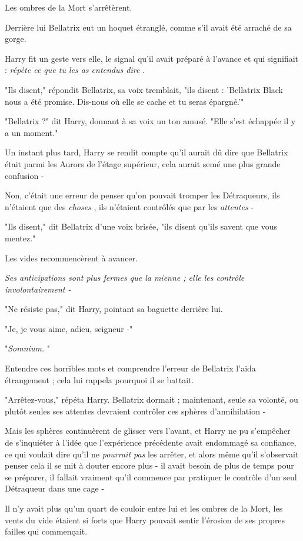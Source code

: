 Les ombres de la Mort s'arrêtèrent.

Derrière lui Bellatrix eut un hoquet étranglé, comme s'il avait été arraché de sa gorge.

Harry fit un geste vers elle, le signal qu'il avait préparé à l'avance et qui signifiait : \emph{répète ce que tu les as entendus dire} .

"Ils disent," répondit Bellatrix, sa voix tremblait, "ils disent : 'Bellatrix Black nous a été promise. Dis-nous où elle se cache et tu seras épargné.'"

"Bellatrix ?" dit Harry, donnant à sa voix un ton amusé. "Elle s'est échappée il y a un moment."

Un instant plus tard, Harry se rendit compte qu'il aurait dû dire que Bellatrix était parmi les Aurors de l'étage supérieur, cela aurait semé une plus grande confusion -

Non, c'était une erreur de penser qu'on pouvait tromper les Détraqueurs, ils n'étaient que des \emph{choses} , ils n'étaient contrôlés que par les \emph{attentes}  -

"Ils disent," dit Bellatrix d'une voix brisée, "ils disent qu'ils savent que vous mentez."

Les vides recommencèrent à avancer.

\emph{Ses anticipations sont plus fermes que la mienne ; elle les contrôle involontairement -} 

"Ne résiste pas," dit Harry, pointant sa baguette derrière lui.

"Je, je vous aime, adieu, seigneur -"

"\emph{Somnium.} "

Entendre ces horribles mots et comprendre l'erreur de Bellatrix l'aida étrangement ; cela lui rappela pourquoi il se battait.

"Arrêtez-vous," répéta Harry. Bellatrix dormait ; maintenant, seule sa volonté, ou plutôt seules ses attentes devraient contrôler ces sphères d'annihilation -

Mais les sphères continuèrent de glisser vers l'avant, et Harry ne pu s'empêcher de s'inquiéter à l'idée que l'expérience précédente avait endommagé sa confiance, ce qui voulait dire qu'il ne \emph{pourrait pas}  les arrêter, et alors même qu'il s'observait penser cela il se mit à douter encore plus - il avait besoin de plus de temps pour se préparer, il fallait vraiment qu'il commence par pratiquer le contrôle d'un seul Détraqueur dans une cage -

Il n'y avait plus qu'un quart de couloir entre lui et les ombres de la Mort, les vents du vide étaient si forts que Harry pouvait sentir l'érosion de ses propres failles qui commençait.

